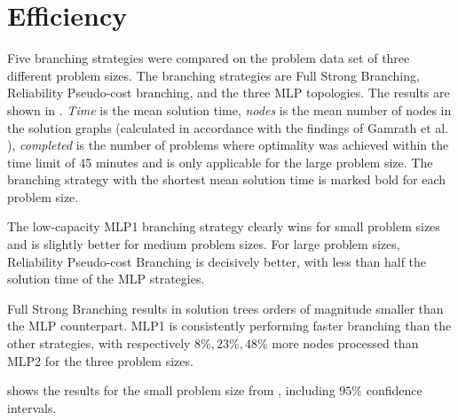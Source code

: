 


\section{Efficiency}

Five branching strategies were compared on the problem data set of three different problem sizes. The branching strategies are Full Strong Branching, Reliability Pseudo-cost branching, and the three \gls{MLP} topologies. The results are shown in . \textit{Time} is the mean solution time, \textit{nodes} is the mean number of nodes in the solution graphs (calculated in accordance with the findings of Gamrath et al. \cite{gamrath2018measuring}), \textit{completed} is the number of problems where optimality was achieved within the time limit of 45 minutes and is only applicable for the large problem size. The branching strategy with the shortest mean solution time is marked bold for each problem size. 

The low-capacity MLP1 branching strategy clearly wins for small problem sizes and is slightly better for medium problem sizes. For large problem sizes, Reliability Pseudo-cost Branching is decisively better, with less than half the solution time of the \gls{MLP} strategies. 

Full Strong Branching results in solution trees orders of magnitude smaller than the \gls{MLP} counterpart. MLP1 is consistently performing faster branching than the other strategies, with respectively $8 \%, 23 \%, 48 \%$ more nodes processed than MLP2 for the three problem sizes.

 shows the results for the small problem size from , including $95 \%$ confidence intervals.
 
